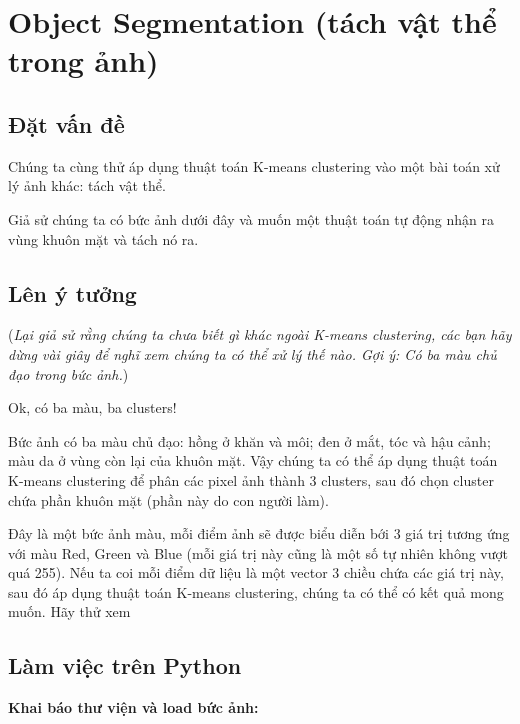 \section{Object Segmentation (tách vật thể trong ảnh)}
 
\subsection{Đặt vấn đề}
Chúng ta cùng thử áp dụng thuật toán K-means clustering vào một bài toán xử lý ảnh khác: tách vật thể.  
 
Giả sử chúng ta có bức ảnh dưới đây và muốn một thuật toán tự động nhận ra vùng khuôn mặt và tách nó ra.  
 
 
 
\subsection{Lên ý tưởng  }
(\textit{Lại giả sử rằng chúng ta chưa biết gì khác ngoài K-means clustering, các bạn hãy dừng vài giây để nghĩ xem chúng ta có thể xử lý thế nào. Gợi ý: Có ba màu chủ đạo trong bức ảnh.}) 
 
Ok, có ba màu, ba clusters! 
 
Bức ảnh có ba màu chủ đạo: hồng ở khăn và môi; đen ở mắt, tóc và hậu cảnh; màu da ở vùng còn lại của khuôn mặt. Vậy chúng ta có thể áp dụng thuật toán K-means clustering để phân các pixel ảnh thành 3 clusters, sau đó chọn cluster chứa phần khuôn mặt (phần này do con người làm). 
 
Đây là một bức ảnh màu, mỗi điểm ảnh sẽ được biểu diễn bới 3 giá trị tương ứng với màu Red, Green và Blue (mỗi giá trị này cũng là một số tự nhiên không vượt quá 255). Nếu ta coi mỗi điểm dữ liệu là một vector 3 chiều chứa các giá trị này, sau đó áp dụng thuật toán K-means clustering, chúng ta có thể có kết quả mong muốn. Hãy thử xem 
 
 
 
\subsection{Làm việc trên Python}
 
\textbf{Khai báo thư viện và load bức ảnh:} 
 
